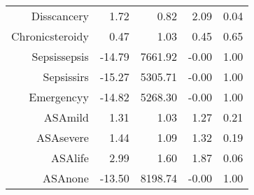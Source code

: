 \begin{tabular}{rrrrr}
$$  Diss\-cancer\-y & 1.72 & 0.82 & 2.09 & 0.04 \\ 
  Chronic\-steroid\-y & 0.47 & 1.03 & 0.45 & 0.65 \\ 
  Sepsis\-sepsis & -14.79 & 7661.92 & -0.00 & 1.00 \\ 
  Sepsis\-sirs & -15.27 & 5305.71 & -0.00 & 1.00 \\ 
  Emergency\-y & -14.82 & 5268.30 & -0.00 & 1.00 \\ 
  ASA\-mild & 1.31 & 1.03 & 1.27 & 0.21 \\ 
  ASA\-severe & 1.44 & 1.09 & 1.32 & 0.19 \\ 
  ASA\-life & 2.99 & 1.60 & 1.87 & 0.06 \\ 
  ASA\-none & -13.50 & 8198.74 & -0.00 & 1.00 \\ 
   \hline
\end{tabular}

